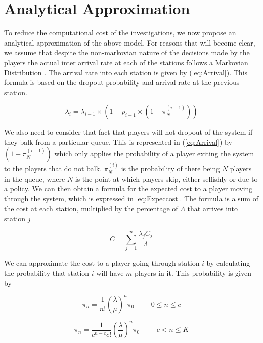 \documentclass[12pt]{article}
\begin{document}
\section{Analytical Approximation}

	To reduce the computational cost of the investigations, we now propose an analytical approximation of the above model. For reasons that will become clear, we assume that despite the non-markovian nature of the decisions made by the players the actual inter arrival rate at each of the stations follows a Markovian Distribution \cite{cite014}. The arrival rate into each station is given by (\ref{eq:Arrival}). This formula is based on the dropout probability and arrival rate at the previous station.

\begin{equation}\label{eq:Arrival}
  \lambda_{i} = \lambda_{i-1}\times(1-p_{i-1}\times(1-\pi_{N}^{(i-1)}))
\end{equation}

 We also need to consider that fact that players will not dropout of the system if they balk from a particular queue. This is represented in (\ref{eq:Arrival}) by $(1 - \pi_{N}^{(i-1)})$ which only applies the probability of a player exiting the system to the players that do not balk. $\pi_{N}^{(i)}$ is the probability of there being $N$ players in the queue, where $N$ is the point at which players skip, either selfishly or due to a policy.
 We can then obtain a formula for the expected cost to a player moving through the system, which is expressed in \ref{eq:Expeccost}. The formula is a sum of the cost at each station, multiplied by the percentage of $\Lambda$ that arrives into station $j$

\begin{equation}\label{eq:Expeccost}
   C = \sum_{j=1}^{n}\frac{\lambda_{j} C_{j}}{\Lambda }
\end{equation}

We can approximate the cost to a player going through station $i$ by calculating the probability that station $i$ will have $m$ players in it\cite{cite018}. This probability is given by

\begin{equation}\label{eq:probcl}
  \pi_n = \frac{1}{n!}\left(\frac{\lambda}{\mu}\right)^{n}\pi_{0} \hspace{1cm} 0\leq n \leq c
\end{equation}

\begin{equation}\label{eq:probcm}
  \pi_n = \frac{1}{c^{n-c}c!}\left(\frac{\lambda}{\mu}\right)^{n}\pi_{0} \hspace{1cm} c< n \leq K
\end{equation}
\end{document}
